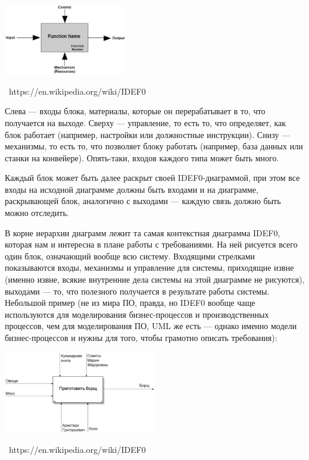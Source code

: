 \documentclass[a5paper]{article}
\newcommand{\attribution}[1] {
    \vspace{-4mm}\begin{flushright}\begin{scriptsize}%
    {\textcopyright\, #1}\end{scriptsize}\end{flushright}
}
\begin{document}
\begin{center}
    \includegraphics[width=0.4\textwidth]{idef0block.png}
    \attribution{https://en.wikipedia.org/wiki/IDEF0}
\end{center}

Слева --- входы блока, материалы, которые он перерабатывает в то, что получается на выходе. Сверху --- управление, то есть то, что определяет, как блок работает (например, настройки или должностные инструкции). Снизу --- механизмы, то есть то, что позволяет блоку работать (например, база данных или станки на конвейере). Опять-таки, входов каждого типа может быть много.

Каждый блок может быть далее раскрыт своей IDEF0-диаграммой, при этом все входы на исходной диаграмме должны быть входами и на диаграмме, раскрывающей блок, аналогично с выходами --- каждую связь должно быть можно отследить.

В корне иерархии диаграмм лежит та самая контекстная диаграмма IDEF0, которая нам и интересна в плане работы с требованиями. На ней рисуется всего один блок, означающий вообще всю систему. Входящими стрелками показываются входы, механизмы и управление для системы, приходящие извне (именно извне, всякие внутренние дела системы на этой диаграмме не рисуются), выходами --- то, что полезного получается в результате работы системы. Небольшой пример (не из мира ПО, правда, но IDEF0 вообще чаще используются для моделирования бизнес-процессов и производственных процессов, чем для моделирования ПО, UML же есть --- однако именно модели бизнес-процессов и нужны для того, чтобы грамотно описать требования):

\begin{center}
    \includegraphics[width=0.5\textwidth]{idef0Example.png}
    \attribution{https://en.wikipedia.org/wiki/IDEF0}
\end{center}
\end{document}
